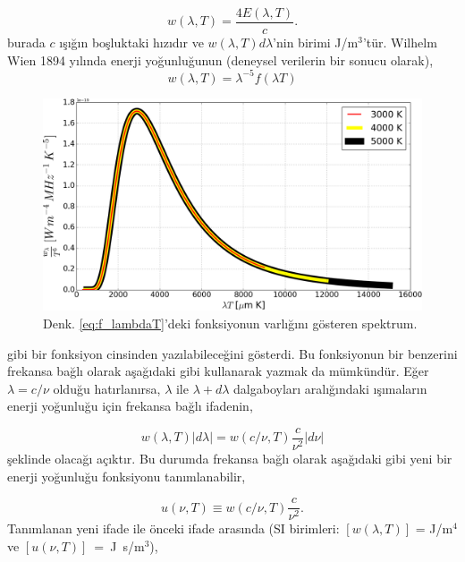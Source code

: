 \documentclass[a4paper,12pt, twoside]{article}
\begin{document}
\begin{equation}
\label{eq:emissiveDensity}
w(\lambda,T) = \frac{4 E(\lambda,T)}{c}.
\end{equation}
burada $c$ ışığın boşluktaki hızıdır ve $w(\lambda,T)d\lambda$'nin birimi J/m$^3$'tür. Wilhelm Wien 1894 yılında enerji yoğunluğunun (deneysel verilerin bir sonucu olarak), 
\begin{equation}
\label{eq:f_lambdaT}
w(\lambda,T) = \lambda^{-5} f(\lambda T)
\end{equation}
\begin{figure}[hbtp]
\center
\includegraphics[scale=.4]{blackbody_spect_vs_lambdaT.png}
\caption{Denk. \ref{eq:f_lambdaT}'deki fonksiyonun varlığını gösteren spektrum.}
\label{fig:karaSpektrum_lamdaT}
\end{figure}
gibi bir fonksiyon cinsinden yazılabileceğini gösterdi. Bu fonksiyonun bir benzerini frekansa bağlı olarak aşağıdaki gibi kullanarak yazmak da mümkündür. Eğer $\lambda = c/\nu$ olduğu hatırlanırsa, $\lambda$ ile $\lambda+d\lambda$ dalgaboyları aralığındaki 
ışımaların enerji yoğunluğu için frekansa bağlı ifadenin,

\begin{equation}
\label{eq:uw_densities1}
w(\lambda,T)|d\lambda| = w(c/\nu,T)\frac{c}{\nu^2}|d\nu| 
\end{equation}
şeklinde olacağı açıktır. Bu durumda frekansa bağlı olarak aşağıdaki gibi yeni bir enerji yoğunluğu fonksiyonu tanımlanabilir,

\begin{equation}
\label{eq:uw_densities2}
u(\nu,T) \equiv w(c/\nu,T)\frac{c}{\nu^2}.
\end{equation}
Tanımlanan yeni ifade ile önceki ifade arasında (SI birimleri: $[w(\lambda,T)]$ = J/m$^4$ ve $[u(\nu,T)]$~=~J~s/m$^3$),
\end{document}
